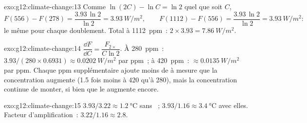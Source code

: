 \begin{solution}{exo:g12:climate-change:13}
Comme $\ln(2C) - \ln C = \ln 2$ quel que soit $C$,
\[
  F(556) - F(278) = \frac{3.93\,\ln 2}{\ln 2} = \qty{3.93}{W/m^2}, \qquad
  F(1112) - F(556) = \frac{3.93\,\ln 2}{\ln 2} = \qty{3.93}{W/m^2}:
\]
le même  pour chaque doublement. Total à \qty{1112}{ppm}~: $2 \times 3.93 =
\qty{7.86}{W/m^2}$.
\end{solution}

\begin{solution}{exo:g12:climate-change:14}
$\dfrac{\dd F}{\dd C} = \dfrac{F_{2\times}}{C \ln 2}$. À \qty{280}{ppm}~:
$3.93/(280 \times 0.6931) \approx \qty{0.0202}{W/m^2}$ par ppm~; à
\qty{420}{ppm}~: $\approx \qty{0.0135}{W/m^2}$ par ppm. Chaque ppm
supplémentaire ajoute moins de  à mesure que la concentration
augmente (1.5 fois moins à 420 qu'à 280), mais la concentration continue
de monter, si bien que le  augmente encore.
\end{solution}

\begin{solution}{exo:g12:climate-change:15}
$3.93/3.22 \approx \qty{1.2}{\degreeCelsius}$ sans ~;
$3.93/1.16 \approx \qty{3.4}{\degreeCelsius}$ avec elles. Facteur
d'amplification~: $3.22/1.16 \approx 2.8$.
\end{solution}

